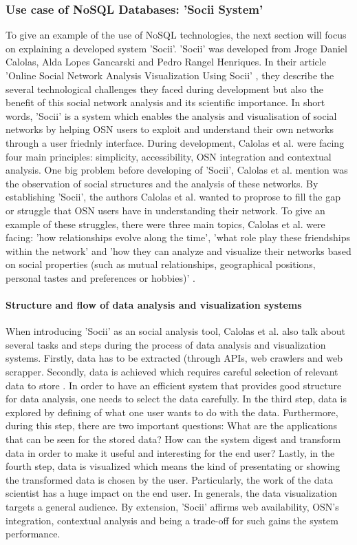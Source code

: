 \subsubsection{Use case of NoSQL Databases: 'Socii System'}

To give an example of the use of NoSQL technologies, the next section will focus on explaining a developed system 'Socii'. 'Socii' was developed from Jroge Daniel Calolas, Alda Lopes Gancarski and Pedro Rangel Henriques. In their article 'Online Social Network Analysis Visualization Using Socii' \cite[p.218-228]{trends_nosql}, they describe the several technological challenges they faced during development but also the benefit of this social network analysis and its scientific importance. In short words, 'Socii' is a system which enables the analysis and visualisation of social networks by helping \ac{OSN} users to exploit and understand their own networks through a user friednly interface. During development, Calolas et al. were facing four main principles: simplicity, accessibility, OSN integration and contextual analysis.
One big problem before developing of 'Socii', Calolas et al. mention was the observation of social structures and the analysis of these networks. By establishing 'Socii', the authors Calolas et al. wanted to proprose to fill the gap or struggle that OSN users have in understanding their network. To give an example of these struggles, there were three main topics, Calolas et al. were facing: 'how relationships evolve along the time', 'what role play these friendships within the network' and 'how they can analyze and visualize their networks based on social properties (such as mutual relationships, geographical positions, personal tastes and preferences or hobbies)' \cite{trends_nosql}. 

\paragraph{Structure and flow of data analysis and visualization systems}

When introducing 'Socii' as an social analysis tool, Calolas et al. also talk about several tasks and steps during the process of data analysis and visualization systems. Firstly, data has to be extracted (through APIs, web crawlers and web scrapper. Secondly, data is achieved which requires careful selection of relevant data to store \cite{trends_nosql}. In order to have an efficient system that provides good structure for data analysis, one needs to select the data carefully. In the third step, data is explored by defining of what one user wants to do with the data. Furthermore, during this step, there are two important questions: What are the applications that can be seen for the stored data? How can the system digest and transform data in order to make it useful and interesting for the end user? 
Lastly, in the fourth step, data is visualized which means the kind of presentating or showing the transformed data is chosen by the user. Particularly, the work of the data scientist has a huge impact on the end user. In generals, the data visualization targets a general audience.  
By extension, 'Socii' affirms web availability, OSN's  integration, contextual analysis and being a trade-off for such gains the system performance.

